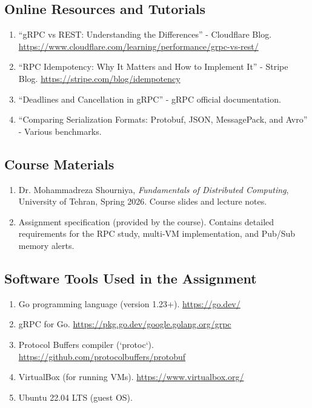 \documentclass[10pt,a4paper]{article}
\begin{document}
\subsection*{Online Resources and Tutorials}
\begin{enumerate}
    \item “gRPC vs REST: Understanding the Differences” - Cloudflare Blog. \url{https://www.cloudflare.com/learning/performance/grpc-vs-rest/}
    
    \item “RPC Idempotency: Why It Matters and How to Implement It” - Stripe Blog. \url{https://stripe.com/blog/idempotency}
    
    \item “Deadlines and Cancellation in gRPC” - gRPC official documentation.
    
    \item “Comparing Serialization Formats: Protobuf, JSON, MessagePack, and Avro” - Various benchmarks.
\end{enumerate}

\subsection*{Course Materials}
\begin{enumerate}
    \item Dr. Mohammadreza Shourniya, \textit{Fundamentals of Distributed Computing}, University of Tehran, Spring 2026. Course slides and lecture notes.
    \item Assignment specification (provided by the course). Contains detailed requirements for the RPC study, multi-VM implementation, and Pub/Sub memory alerts.
\end{enumerate}

\subsection*{Software Tools Used in the Assignment}
\begin{enumerate}
    \item Go programming language (version 1.23+). \url{https://go.dev/}
    \item gRPC for Go. \url{https://pkg.go.dev/google.golang.org/grpc}
    \item Protocol Buffers compiler (`protoc`). \url{https://github.com/protocolbuffers/protobuf}
    \item VirtualBox (for running VMs). \url{https://www.virtualbox.org/}
    \item Ubuntu 22.04 LTS (guest OS).
\end{enumerate}
\end{document}
